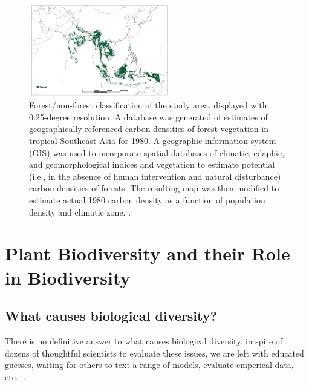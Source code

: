  
 \begin{figure}[ht]
    \centering
        \includegraphics[width = 0.55\textwidth]{graphics/forestcover.png}
        \caption{Forest/non-forest classification of the study area, displayed with 0.25-degree resolution. A database was generated of estimates of geographically referenced carbon densities of forest vegetation in tropical Southeast Asia for 1980. A geographic information system (GIS) was used to incorporate spatial databases of climatic, edaphic, and geomorphological indices and vegetation to estimate potential (i.e., in the absence of human intervention and natural disturbance) carbon densities of forests. The resulting map was then modified to estimate actual 1980 carbon density as a function of population density and climatic zone. \citep{brown1991biomass}.}
    \end{figure}



\section{Plant Biodiversity and their Role in Biodiversity}

\subsection{What causes biological diversity?}

There is no definitive answer to what causes biological diversity. in spite of dozens of thoughtful scientists to evaluate these issues, we are left with educated guesses, waiting for others to text a range of models, evaluate emperical data, etc. ...

